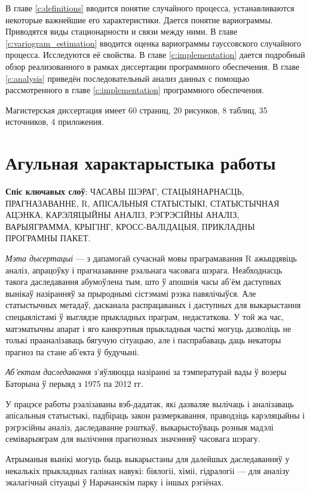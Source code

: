 В главе \ref{c:definitions} вводится понятие случайного процесса, устанавливаются некоторые важнейшие его характеристики. Дается понятие вариограммы. Приводятся виды стационарности и связи между ними. В главе \ref{c:variogram_estimation} вводится оценка вариограммы гауссовского случайного процесса. Исследуются её свойства. В главе \ref{c:implementation} дается подробный обзор реализованного в рамках диссертации программного обеспечения. В главе \ref{c:analysis} приведён последовательный анализ данных с помощью рассмотренного в главе \ref{c:implementation} программного обеспечения.

Магистерская диссертация имеет 60 страниц, 20 рисунков, 8 таблиц, 35 источников, 4 приложения.

\newpage

\chapter*{Агульная характарыстыка работы}

\textbf{Спіс ключавых слоў}: ЧАСАВЫ ШЭРАГ, СТАЦЫЯНАРНАСЦЬ, ПРАГНАЗАВАННЕ, R, АПІСАЛЬНЫЯ СТАТЫСТЫКІ, СТАТЫСТЫЧНАЯ АЦЭНКА, КАРЭЛЯЦЫЙНЫ АНАЛIЗ, РЭГРЭСIЙНЫ АНАЛIЗ, ВАРЫЯГРАММА, КРЫГIНГ, КРОСС-ВАЛIДАЦЫЯ, ПРИКЛАДНЫ ПРОГРАМНЫ ПАКЕТ\@.

\textit{Мэта дысертацыі} --- з дапамогай сучаснай мовы праграмавання R ажыццявіць аналіз, апрацоўку і прагназаванне рэальнага часовага шэрага. Неабходнасць такога даследавання абумоўлена тым, што ў апошнія часы аб'ём даступных вынікаў назіранняў за прыроднымі сістэмамі рэзка павялічыўся. Але статыстычных метадаў, дасканала распрацаваных і даступных для выкарыстання спецыялістамі ў выглядзе прыкладных праграм, недастаткова. У той жа час, матэматычны апарат і яго канкрэтныя прыкладныя часткі могуць дазволіць не толькі прааналізаваць бягучую сітуацыю, але і паспрабаваць даць некаторы прагноз па стане аб'екта ў будучыні.

\textit{Аб'ектам даследавання} з'яўляюцца назіранні за тэмпературай вады ў возеры Баторына ў перыяд з 1975 па 2012 гг.

У працэсе работы рэалізаваны вэб-дадатак, якi дазваляе вылічаць і аналізаваць апісальныя статыстыкі, падбіраць закон размеркавання, праводзіць карэляцыйны і рэгрэсійны аналіз, даследаванне рэшткаў, выкарыстоўваць розныя мадэлі семіварыяграм для вылічэння прагнозных значэнняў часовага шэрагу.

Атрыманыя вынікі могуць быць выкарыстаны для далейшых даследаванняў у некалькіх прыкладных галінах навукі: біялогіі, хіміі, гідралогіі --- для аналізу экалагічнай сітуацыі ў Нарачанскім парку і іншых рэгіёнах.

